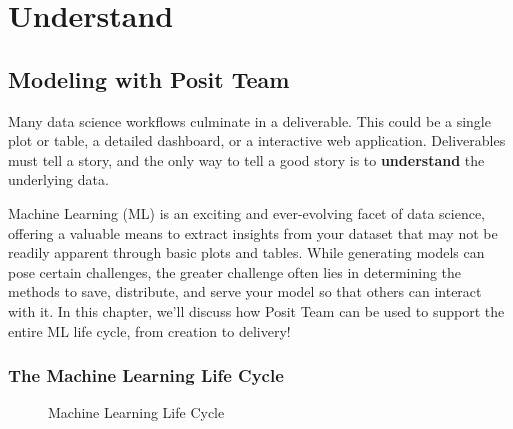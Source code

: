 \documentclass[
  letterpaper,
  DIV=11,
  numbers=noendperiod]{scrreprt}
\begin{document}
\part{Understand}

\chapter{Modeling with Posit Team}\label{modeling-with-posit-team}

Many data science workflows culminate in a deliverable. This could be a
single plot or table, a detailed dashboard, or a interactive web
application. Deliverables must tell a story, and the only way to tell a
good story is to \textbf{understand} the underlying data.

Machine Learning (ML) is an exciting and ever-evolving facet of data
science, offering a valuable means to extract insights from your dataset
that may not be readily apparent through basic plots and tables. While
generating models can pose certain challenges, the greater challenge
often lies in determining the methods to save, distribute, and serve
your model so that others can interact with it. In this chapter, we'll
discuss how Posit Team can be used to support the entire ML life cycle,
from creation to delivery!

\section{The Machine Learning Life
Cycle}\label{the-machine-learning-life-cycle}

\begin{figure}


\caption{\label{fig-ml-lifecycle}Machine Learning Life Cycle}

\end{figure}%
\end{document}
